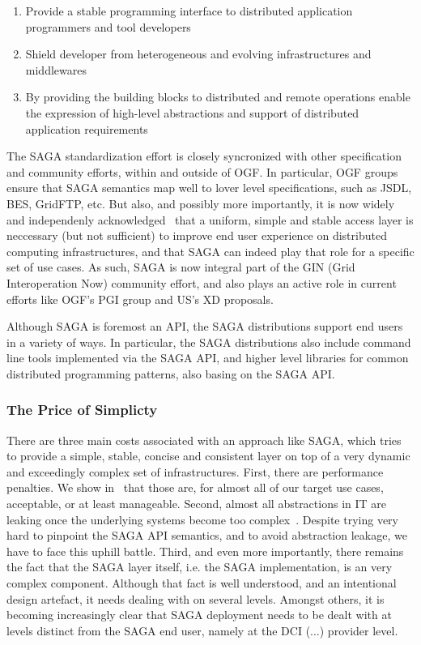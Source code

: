 \documentclass[10pt,conference,final,letterpaper,twoside,twocolumn,]{IEEEtran}
\begin{document}
 \begin{enumerate}

  \item Provide a stable programming interface to distributed
  application programmers and tool developers
 
  \item Shield developer from heterogeneous and evolving
  infrastructures and middlewares

  \item By providing the building blocks to distributed and remote
  operations enable the expression of high-level abstractions and
  support of distributed application requirements

 \end{enumerate}

 The SAGA standardization effort is closely syncronized with other
 specification and community efforts, within and outside of OGF.  In
 particular, OGF groups ensure that SAGA semantics map well to lover
 level specifications, such as JSDL, BES, GridFTP, etc.   But also,
 and possibly more importantly, it is now widely and independenly
 acknowledged~\cite{refs?} that a uniform, simple and stable access
 layer is neccessary (but not sufficient) to improve end user
 experience on distributed computing infrastructures, and that SAGA
 can indeed play that role for a specific set of use cases.  As such,
 SAGA is now integral part of the GIN (Grid Interoperation Now)
 community effort, and also plays an active role in current efforts
 like OGF's PGI group and US's XD proposals.
  
 Although SAGA is foremost an API, the SAGA distributions support end
 users in a variety of ways.  In particular, the SAGA distributions
 also include command line tools implemented via the SAGA API, and
 higher level libraries for common distributed programming patterns,
 also basing on the SAGA API.


 \subsubsection*{The Price of Simplicty\cite{sagaprice}}

  There are three main costs associated with an approach like SAGA,
  which tries to provide a simple, stable, concise and consistent
  layer on top of a very dynamic and exceedingly complex set of
  infrastructures.  First, there are performance penalties.  We show
  in~\cite{sagaperf} that those are, for almost all of our target use
  cases, acceptable, or at least manageable.  Second, almost all
  abstractions in IT are leaking once the underlying systems become
  too complex~\cite{leaky_abstractions}.  Despite trying very hard to
  pinpoint the SAGA API semantics, and to avoid abstraction leakage,
  we have to face this uphill battle.  Third, and even more
  importantly, there remains the fact that the SAGA layer itself, i.e.
  the SAGA implementation, is an very complex component.  Although
  that fact is well understood, and an intentional design artefact, it
  needs dealing with on several levels.  Amongst others, it is
  becoming increasingly clear that SAGA deployment needs to be dealt
  with at levels distinct from the SAGA end user, namely at the DCI
  (...) provider level.
\end{document}
